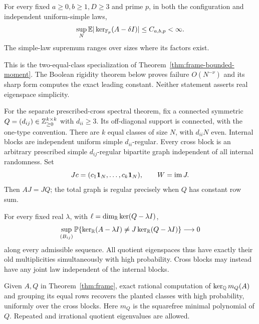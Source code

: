 \begin{theorem}\label{thm:general-moment}
For every fixed $a\ge0,b\ge1,D\ge3$ and prime $p$, in both the
configuration and independent uniform-simple laws,
\begin{equation}\label{eq:poly-moment}
 \sup_N\mathbb E|\ker_{\mathbb F_p}(A-\delta I)|\le C_{a,b,p}<\infty.
\end{equation}
The simple-law supremum ranges over sizes where its factors exist.
\end{theorem}
This is the two-equal-class specialization of
Theorem~\ref{thm:frame-bounded-moment}. The Boolean rigidity theorem
below proves failure $O(N^{-\nu})$ and its sharp form computes
the exact leading constant. Neither statement asserts real
eigenspace simplicity.

For the separate prescribed-cross spectral theorem, fix a connected
symmetric $Q=(d_{ij})\in\mathbb Z_{\ge0}^{k\times k}$ with $d_{ii}\ge3$.
Its off-diagonal support is connected, with the one-type convention.
There are $k$ equal classes of size $N$, with $d_{ii}N$ even.
Internal blocks are independent uniform simple $d_{ii}$-regular.
Every cross block is an arbitrary prescribed simple $d_{ij}$-regular
bipartite graph independent of all internal randomness. Set
\begin{equation}\label{eq:J}
 Jc=(c_1\mathbf 1_N,\ldots,c_k\mathbf 1_N),\qquad W=\operatorname{im} J.
\end{equation}
Then $AJ=JQ$; the total graph is regular precisely when $Q$ has
constant row sum.

\begin{theorem}\label{thm:frame}
For every fixed real $\lambda$, with
$\ell=\dim_\mathbb R\ker(Q-\lambda I)$,
\begin{equation}\label{eq:frame-main}
 \sup_{(B_{ij})}\mathbb P\{
 \ker_\mathbb R(A-\lambda I)\ne J\ker_\mathbb R(Q-\lambda I)\}\longrightarrow0
\end{equation}
along every admissible sequence. All quotient eigenspaces thus have
exactly their old multiplicities simultaneously with high probability.
Cross blocks may instead have any joint law independent of the
internal blocks.
\end{theorem}

\begin{corollary}\label{cor:frame-recovery}
Given $A,Q$ in Theorem~\ref{thm:frame}, exact rational computation
of $\ker_\mathbb Q m_Q(A)$ and grouping its equal rows recovers the planted
classes with high probability, uniformly over the cross blocks.
Here $m_Q$ is the squarefree minimal polynomial of $Q$.
Repeated and irrational quotient eigenvalues are allowed.
\end{corollary}


